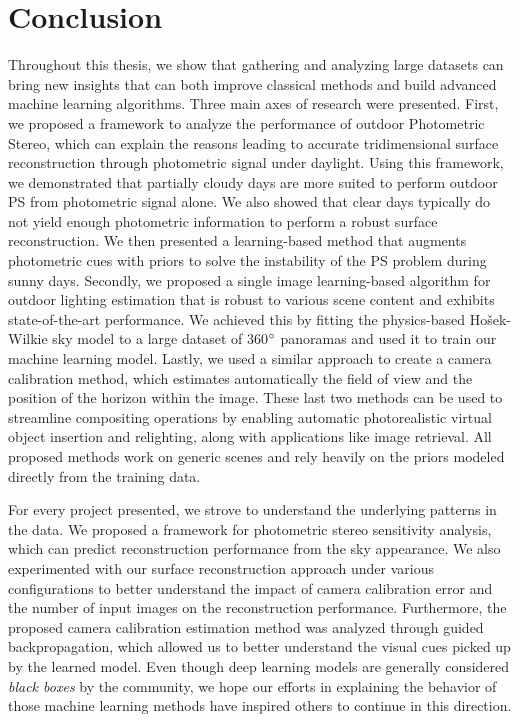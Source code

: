 \chapter*{Conclusion}         %


Throughout this thesis, we show that gathering and analyzing large datasets can bring new insights that can both improve classical methods and build advanced machine learning algorithms. Three main axes of research were presented. First, we proposed a framework to analyze the performance of outdoor Photometric Stereo, which can explain the reasons leading to accurate tridimensional surface reconstruction through photometric signal under daylight. Using this framework, we demonstrated that partially cloudy days are more suited to perform outdoor PS from photometric signal alone. We also showed that clear days typically do not yield enough photometric information to perform a robust surface reconstruction. We then presented a learning-based method that augments photometric cues with priors to solve the instability of the PS problem during sunny days. Secondly, we proposed a single image learning-based algorithm for outdoor lighting estimation that is robust to various scene content and exhibits state-of-the-art performance. We achieved this by fitting the physics-based Ho\v{s}ek-Wilkie sky model to a large dataset of 360$^{\circ}$ panoramas and used it to train our machine learning model. Lastly, we used a similar approach to create a camera calibration method, which estimates automatically the field of view and the position of the horizon within the image. These last two methods can be used to streamline compositing operations by enabling automatic photorealistic virtual object insertion and relighting, along with applications like image retrieval. All proposed methods work on generic scenes and rely heavily on the priors modeled directly from the training data. 

For every project presented, we strove to understand the underlying patterns in the data. We proposed a framework for photometric stereo sensitivity analysis, which can predict reconstruction performance from the sky appearance. We also experimented with our surface reconstruction approach under various configurations to better understand the impact of camera calibration error and the number of input images on the reconstruction performance. Furthermore, the proposed camera calibration estimation method was analyzed through guided backpropagation, which allowed us to better understand the visual cues picked up by the learned model. Even though deep learning models are generally considered \emph{black boxes} by the community, we hope our efforts in explaining the behavior of those machine learning methods have inspired others to continue in this direction.

